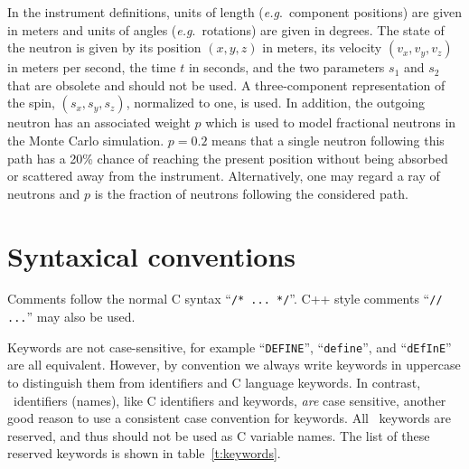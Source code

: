 In the instrument definitions, units of length (\textit{e.g}.\ component
positions) are given in meters and units of angles (\textit{e.g}.\
rotations) are given in degrees.  The state of the neutron is given by
its position $(x,y,z)$ in meters, its velocity $(v_x, v_y, v_z)$ in
meters per second, the time $t$ in seconds, and the two parameters
$s_1$ and $s_2$ that are obsolete and should not be used. A three-component
representation of the spin, $\left( s_x, s_y, s_z \right)$, normalized to
one, is used. In addition, the outgoing neutron has an associated weight $p$
which is used to model fractional neutrons in the Monte Carlo simulation.
$p=0.2$ means that a single neutron following this path has a 20\% chance of
reaching the present position without being absorbed or scattered away from
the instrument. Alternatively, one may regard a ray of neutrons and $p$ is
the fraction of neutrons following the considered path.

\section{Syntaxical conventions}
\label{s:syntax}

Comments follow the normal C syntax ``\verb+/* ... */+''. C++ style
comments ``\verb+// ...+'' may also be used.


Keywords are not case-sensitive, for example ``\verb+DEFINE+'',
``\verb+define+'', and ``\verb+dEfInE+'' are all equivalent. However, by
convention we always write keywords in uppercase to distinguish them
from identifiers and C language keywords. In contrast, \MCS\
identifiers (names), like C identifiers and keywords, \emph{are} case
sensitive, another good reason to use a consistent case convention for
keywords. All \MCS\ keywords are reserved, and thus should not be used
as C variable names. The list of these reserved keywords is shown in table~\ref{t:keywords}. 

